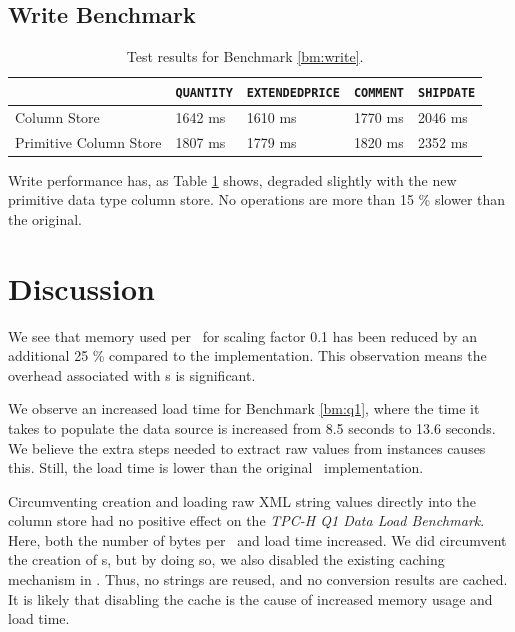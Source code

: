 \subsection{Write Benchmark}
\label{sub:Write Benchmark}
\begin{table}
    \begin{tabularx}{\textwidth}{X | X X X X}
         & \texttt{QUANTITY} & \texttt{EXTENDEDPRICE} & \texttt{COMMENT} & \texttt{SHIPDATE}\\ 
        \hline
        \hline
        Column Store & 1642 ms & 1610 ms & 1770 ms & 2046 ms \\
        Primitive Column Store & 1807 ms & 1779 ms & 1820 ms & 2352 ms \\
    \end{tabularx}
    \caption{Test results for Benchmark \ref{bm:write}.}
    \label{tab:primitive-write}
\end{table}
Write performance has, as Table \ref{tab:primitive-write} shows, degraded slightly with the new primitive data type column store. No operations are more than 15 \% slower than the original.

\section{Discussion}
\label{sec:part2-discussion}

We see that memory used per \lineitem~for scaling factor 0.1 has been reduced by an additional 25 \% compared to the  implementation. This observation means the overhead associated with s is significant.

We observe an increased load time for Benchmark \ref{bm:q1}, where the time it takes to populate the data source is increased from 8.5 seconds to 13.6 seconds. We believe the extra steps needed to extract raw values from  instances causes this. Still, the load time is lower than the original \gap~implementation.

Circumventing  creation and loading raw XML string values directly into the column store had no positive effect on the \textit{TPC-H Q1 Data Load Benchmark}. Here, both the number of bytes per \lineitem~and load time increased. We did circumvent the creation of s, but by doing so, we also disabled the existing caching mechanism in \gap. Thus, no strings are reused, and no conversion results are cached. It is likely that disabling the cache is the cause of increased memory usage and load time. 

